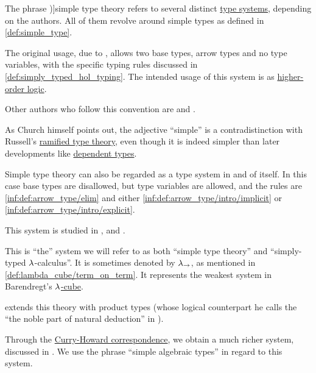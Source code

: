 \begin{concept}\label{con:simple_type_theory}
  The phrase \term[en=simple type theory (\cite[ix]{Hindley1997BasicSTT})]{simple type theory} refers to several distinct \hyperref[def:abstract_type_system]{type systems}, depending on the authors. All of them revolve around simple types as defined in \cref{def:simple_type}.

  \begin{thmenum}
     The original usage, due to , allows two base types, arrow types and no type variables, with the specific typing rules discussed in \cref{def:simply_typed_hol_typing}. The intended usage of this system is as \hyperref[rem:predicate_logic]{higher-order logic}.

    Other authors who follow this convention are  and .

    As Church himself points out, the adjective \enquote{simple} is a contradistinction with Russell's \hyperref[con:ramified_type_theory]{ramified type theory}, even though it is indeed simpler than later developments like \hyperref[con:dependent_type]{dependent types}.

     Simple type theory can also be regarded as a type system in and of itself. In this case base types are disallowed, but type variables are allowed, and the rules are \ref{inf:def:arrow_type/elim} and either \ref{inf:def:arrow_type/intro/implicit} or \ref{inf:def:arrow_type/intro/explicit}.

    This system is studied in ,  and .

    This is \enquote{the} system we will refer to as both \enquote{simple type theory} and \enquote{simply-typed \( {\mathrm \lambda} \)-calculus}. It is sometimes denoted by \( {\mathrm \lambda}_{\rightarrow} \), as mentioned in \cref{def:lambda_cube/term_on_term}. It represents the weakest system in Barendregt's \hyperref[def:lambda_cube]{\( {\mathrm \lambda} \)-cube}.

     extends this theory with product types (whose logical counterpart he calls the \enquote{the noble part of natural deduction} in \cite[\S 5.3]{GirardEtAl1989ProofsAndTypes}).

     Through the \hyperref[con:curry_howard_correspondence]{Curry-Howard correspondence}, we obtain a much richer system, discussed in . We use the phrase \enquote{simple algebraic types} in regard to this system.


\end{thmenum}
\end{concept}
